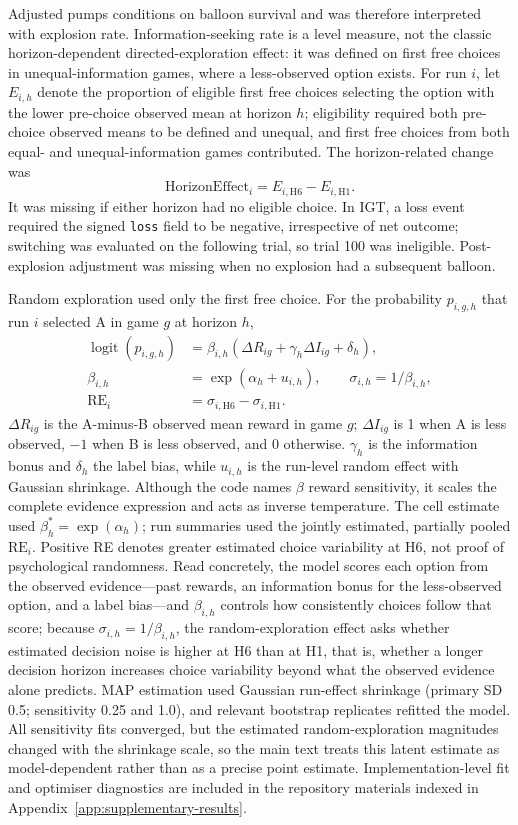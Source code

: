 \documentclass[logo,msc,inf]{infthesis}       %
\begin{document}
Adjusted pumps conditions on balloon survival and was therefore interpreted with explosion rate. Information-seeking rate is a level measure, not the classic horizon-dependent directed-exploration effect: it was defined on first free choices in unequal-information games, where a less-observed option exists. For run $i$, let $E_{i,h}$ denote the proportion of eligible first free choices selecting the option with the lower pre-choice observed mean at horizon $h$; eligibility required both pre-choice observed means to be defined and unequal, and first free choices from both equal- and unequal-information games contributed. The horizon-related change was
\[
\mathrm{HorizonEffect}_{i}=E_{i,\mathrm{H6}}-E_{i,\mathrm{H1}}.
\]
It was missing if either horizon had no eligible choice. In IGT, a loss event required the signed \texttt{loss} field to be negative, irrespective of net outcome; switching was evaluated on the following trial, so trial 100 was ineligible. Post-explosion adjustment was missing when no explosion had a subsequent balloon.

Random exploration used only the first free choice. For the probability $p_{i,g,h}$ that run $i$ selected A in game $g$ at horizon $h$,
\[
\begin{aligned}
\operatorname{logit}(p_{i,g,h})&=\beta_{i,h}(\Delta R_{ig}+\gamma_h\Delta I_{ig}+\delta_h),\\
\beta_{i,h}&=\exp(\alpha_h+u_{i,h}),\qquad \sigma_{i,h}=1/\beta_{i,h},\\
\mathrm{RE}_{i}&=\sigma_{i,\mathrm{H6}}-\sigma_{i,\mathrm{H1}}.
\end{aligned}
\]
$\Delta R_{ig}$ is the A-minus-B observed mean reward in game $g$; $\Delta I_{ig}$ is 1 when A is less observed, $-1$ when B is less observed, and 0 otherwise. $\gamma_h$ is the information bonus and $\delta_h$ the label bias, while $u_{i,h}$ is the run-level random effect with Gaussian shrinkage. Although the code names $\beta$ reward sensitivity, it scales the complete evidence expression and acts as inverse temperature. The cell estimate used $\beta_h^{*}=\exp(\alpha_h)$; run summaries used the jointly estimated, partially pooled $\mathrm{RE}_i$. Positive RE denotes greater estimated choice variability at H6, not proof of psychological randomness. Read concretely, the model scores each option from the observed evidence---past rewards, an information bonus for the less-observed option, and a label bias---and $\beta_{i,h}$ controls how consistently choices follow that score; because $\sigma_{i,h}=1/\beta_{i,h}$, the random-exploration effect asks whether estimated decision noise is higher at H6 than at H1, that is, whether a longer decision horizon increases choice variability beyond what the observed evidence alone predicts. MAP estimation used Gaussian run-effect shrinkage (primary SD 0.5; sensitivity 0.25 and 1.0), and relevant bootstrap replicates refitted the model. All sensitivity fits converged, but the estimated random-exploration magnitudes changed with the shrinkage scale, so the main text treats this latent estimate as model-dependent rather than as a precise point estimate. Implementation-level fit and optimiser diagnostics are included in the repository materials indexed in Appendix~\ref{app:supplementary-results}.
\end{document}
